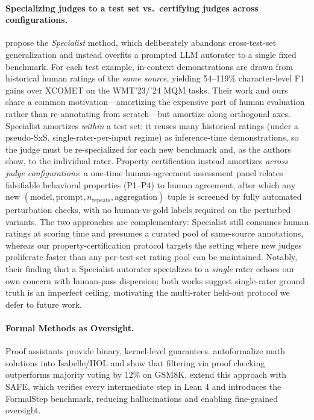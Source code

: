 \documentclass{article}
\begin{document}
\paragraph{Specializing judges to a test set vs.\ certifying judges across configurations.}
\citet{finkelstein2024specialist} propose the \emph{Specialist} method, which deliberately abandons cross-test-set generalization and instead overfits a prompted LLM autorater to a single fixed benchmark.
For each test example, in-context demonstrations are drawn from historical human ratings of the \emph{same source}, yielding 54--119\% character-level F1 gains over \textsc{XCOMET} on the WMT'23/'24 MQM tasks.
Their work and ours share a common motivation---amortizing the expensive part of human evaluation rather than re-annotating from scratch---but amortize along orthogonal axes.
Specialist amortizes \emph{within} a test set: it reuses many historical ratings (under a pseudo-SxS, single-rater-per-input regime) as inference-time demonstrations, so the judge must be re-specialized for each new benchmark and, as the authors show, to the individual rater.
Property certification instead amortizes \emph{across judge configurations}: a one-time human-agreement assessment panel relates falsifiable behavioral properties (P1--P4) to human agreement, after which any new $(\text{model},\text{prompt},n_\text{repeats},\text{aggregation})$ tuple is screened by fully automated perturbation checks, with no human-vs-gold labels required on the perturbed variants.
The two approaches are complementary: Specialist still consumes human ratings at scoring time and presumes a curated pool of same-source annotations, whereas our property-certification protocol targets the setting where new judges proliferate faster than any per-test-set rating pool can be maintained.
Notably, their finding that a Specialist autorater specializes to a \emph{single} rater echoes our own concern with human-pass dispersion; both works suggest single-rater ground truth is an imperfect ceiling, motivating the multi-rater held-out protocol we defer to future work.

\paragraph{Formal Methods as Oversight.}
Proof assistants provide binary, kernel-level guarantees. \citet{zhou2024donttrustverify} autoformalize math solutions into Isabelle/HOL and show that filtering via proof checking outperforms majority voting by 12\% on GSM8K. \citet{liu2025safe} extend this approach with SAFE, which verifies every intermediate step in Lean 4 and introduces the FormalStep benchmark, reducing hallucinations and enabling fine-grained oversight.
\end{document}

